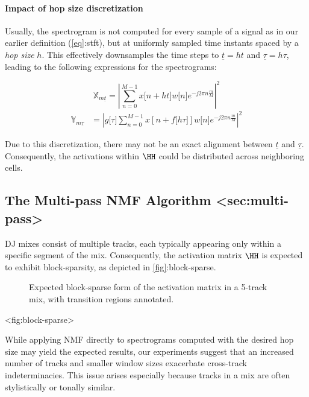 \paragraph{Impact of hop size discretization}

Usually, the spectrogram is not computed for every sample of a signal as
in our earlier definition (\hyperref[eq]{{[}eq{]}}:stft), but at
uniformly sampled time instants spaced by a \emph{hop size} \(h\). This
effectively downsamples the time steps to \(\underset{¯}{t} = ht\) and
\(\underset{¯}{\tau} = h\tau\), leading to the following expressions for
the spectrograms:

\[{\mathbb{X}}_{m\underset{¯}{t}} = \left| {\sum_{n = 0}^{M - 1}x\lbrack n + ht\rbrack w\lbrack n\rbrack e^{- j2\pi n\frac{m}{M}}} \right|^{2}\]
\[\begin{aligned}
{\mathbb{Y}}_{m\underset{¯}{\tau}} & = \left| {g\lbrack\tau\rbrack\sum_{n = 0}^{M - 1}x\left\lbrack n + f\lbrack h\tau\rbrack \right\rbrack w\lbrack n\rbrack e^{- j2\pi n\frac{m}{M}}} \right|^{2}
\end{aligned}\]

Due to this discretization, there may not be an exact alignment between
\(\underset{¯}{t}\) and \(\underset{¯}{\tau}\). Consequently, the
activations within \(\HH\) could be distributed across
neighboring cells.

\subsection{The Multi-pass NMF Algorithm
\textless sec:multi-pass\textgreater{}}

DJ mixes consist of multiple tracks, each typically appearing only
within a specific segment of the mix. Consequently, the activation
matrix \(\HH\) is expected to exhibit block-sparsity, as depicted
in \hyperref[fig]{{[}fig{]}}:block-sparse.

\begin{figure}
\centering

\caption{Expected block-sparse form of the activation matrix in a
5-track mix, with transition regions annotated.}
\end{figure}

\textless fig:block-sparse\textgreater{}

While applying NMF directly to spectrograms computed with the desired
hop size may yield the expected results, our experiments suggest that an
increased number of tracks and smaller window sizes exacerbate
cross-track indeterminacies. This issue arises especially because tracks
in a mix are often stylistically or tonally similar.

